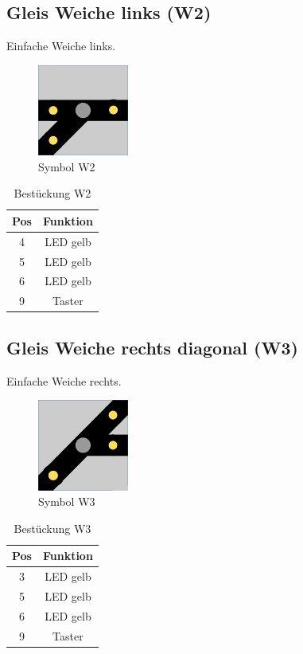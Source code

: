 \documentclass[10pt,a4paper]{article}
\begin{document}
\subsection{Gleis Weiche links (W2)}
Einfache Weiche links.
\begin{figure}[hbtp]
\centering
\includegraphics[width=3cm]{../folien/w2.png}
\caption{Symbol W2}
\end{figure}
\begin{table}[h!]
\centering
\begin{tabular}{c|c}
\textbf{Pos} & \textbf{Funktion} \\ \hline
4 & LED gelb \\
5 & LED gelb \\
6 & LED gelb \\
9 & Taster
\end{tabular}
\caption{Bestückung W2}
\end{table}

\newpage
\subsection{Gleis Weiche rechts diagonal (W3)}
Einfache Weiche rechts.
\begin{figure}[hbtp]
\centering
\includegraphics[width=3cm]{../folien/w3.png}
\caption{Symbol W3}
\end{figure}
\begin{table}[h!]
\centering
\begin{tabular}{c|c}
\textbf{Pos} & \textbf{Funktion} \\ \hline
3 & LED gelb \\
5 & LED gelb \\
6 & LED gelb \\
9 & Taster
\end{tabular}
\caption{Bestückung W3}
\end{table}
\end{document}
